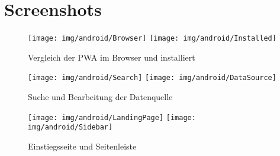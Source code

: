 \chapter{Screenshots}
\label{chap:screenshots}


\begin{figure}[h]
    \centering
    \texttt{[image: img/android/Browser]}\hspace{1em}
    \texttt{[image: img/android/Installed]}
    \caption{Vergleich der PWA im Browser und installiert}
    \label{figure:vergleichderpwaimbrowserundinstalliert}
\end{figure}

\begin{figure}[h]
    
    \centering
    \texttt{[image: img/android/Search]}\hspace{1em}
    \texttt{[image: img/android/DataSource]}
    \caption{Suche und Bearbeitung der Datenquelle}
    \label{figure:sucheundbearbeitungderdatenquelle}
\end{figure}


\begin{figure}[h]
    
    \centering
    \texttt{[image: img/android/LandingPage]}\hspace{1em}
    \texttt{[image: img/android/Sidebar]}
    \caption{Einstiegsseite und Seitenleiste}
    \label{figure:einstiegsseiteundseitenleiste}
\end{figure}
